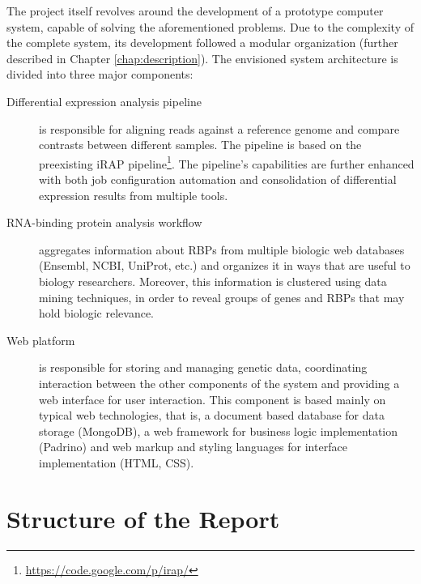 
The project itself revolves around the development of a prototype computer
system, capable of solving the aforementioned problems. Due to the complexity of
the complete system, its development followed a modular organization (further
described in Chapter \ref{chap:description}). The envisioned system
architecture is divided into three major components:

\begin{description}

  \item[Differential expression analysis pipeline]
  is responsible for aligning reads against a reference genome and compare
  contrasts between different samples. The pipeline is based on the preexisting
  iRAP pipeline\footnote{\url{https://code.google.com/p/irap/}}. The pipeline's
  capabilities are further enhanced with both job configuration automation and
  consolidation of differential expression results from multiple tools.

  \item[RNA-binding protein analysis workflow]
  aggregates information about RBPs from multiple biologic web databases
  (Ensembl, NCBI, UniProt, etc.) and organizes it in ways that are useful to
  biology researchers. Moreover, this information is clustered using data mining
  techniques, in order to reveal groups of genes and RBPs that may hold biologic
  relevance.

  \item[Web platform]
  is responsible for storing and managing genetic data, coordinating interaction
  between the other components of the system and providing a web interface for
  user interaction. This component is based mainly on typical web technologies,
  that is, a document based database for data storage (MongoDB), a web framework
  for business logic implementation (Padrino) and web markup and styling
  languages for interface implementation (HTML, CSS).

\end{description}

\section{Structure of the Report} \label{sec:outline}


